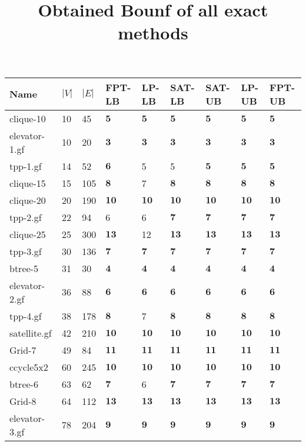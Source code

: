 \documentclass{article}
\title{Obtained Bounf of all exact methods}
\begin{document}
\maketitle

\begin{longtable}{|l |l |l |l |l |l |l |l |l |}
\hline
Name&$|V|$&$|E|$&FPT-LB&LP-LB&SAT-LB&SAT-UB&LP-UB&FPT-UB\\
\hline
clique-10&10&45&$\mathbf{5}$&$\mathbf{5}$&$\mathbf{5}$&$\mathbf{5}$&$\mathbf{5}$&$\mathbf{5}$\\
elevator-1.gf&10&20&$\mathbf{3}$&$\mathbf{3}$&$\mathbf{3}$&$\mathbf{3}$&$\mathbf{3}$&$\mathbf{3}$\\
tpp-1.gf&14&52&$\mathbf{6}$&5&5&$\mathbf{5}$&$\mathbf{5}$&$\mathbf{5}$\\
clique-15&15&105&$\mathbf{8}$&7&$\mathbf{8}$&$\mathbf{8}$&$\mathbf{8}$&$\mathbf{8}$\\
clique-20&20&190&$\mathbf{10}$&$\mathbf{10}$&$\mathbf{10}$&$\mathbf{10}$&$\mathbf{10}$&$\mathbf{10}$\\
tpp-2.gf&22&94&6&6&$\mathbf{7}$&$\mathbf{7}$&$\mathbf{7}$&$\mathbf{7}$\\
clique-25&25&300&$\mathbf{13}$&12&$\mathbf{13}$&$\mathbf{13}$&$\mathbf{13}$&$\mathbf{13}$\\
tpp-3.gf&30&136&$\mathbf{7}$&$\mathbf{7}$&$\mathbf{7}$&$\mathbf{7}$&$\mathbf{7}$&$\mathbf{7}$\\
btree-5&31&30&$\mathbf{4}$&$\mathbf{4}$&$\mathbf{4}$&$\mathbf{4}$&$\mathbf{4}$&$\mathbf{4}$\\
elevator-2.gf&36&88&$\mathbf{6}$&$\mathbf{6}$&$\mathbf{6}$&$\mathbf{6}$&$\mathbf{6}$&$\mathbf{6}$\\
tpp-4.gf&38&178&$\mathbf{8}$&7&$\mathbf{8}$&$\mathbf{8}$&$\mathbf{8}$&$\mathbf{8}$\\
satellite.gf&42&210&$\mathbf{10}$&$\mathbf{10}$&$\mathbf{10}$&$\mathbf{10}$&$\mathbf{10}$&$\mathbf{10}$\\
Grid-7&49&84&$\mathbf{11}$&$\mathbf{11}$&$\mathbf{11}$&$\mathbf{11}$&$\mathbf{11}$&$\mathbf{11}$\\
ccycle5x2&60&245&$\mathbf{10}$&$\mathbf{10}$&$\mathbf{10}$&$\mathbf{10}$&$\mathbf{10}$&$\mathbf{10}$\\
btree-6&63&62&$\mathbf{7}$&6&$\mathbf{7}$&$\mathbf{7}$&$\mathbf{7}$&$\mathbf{7}$\\
Grid-8&64&112&$\mathbf{13}$&$\mathbf{13}$&$\mathbf{13}$&$\mathbf{13}$&$\mathbf{13}$&$\mathbf{13}$\\
elevator-3.gf&78&204&$\mathbf{9}$&$\mathbf{9}$&$\mathbf{9}$&$\mathbf{9}$&$\mathbf{9}$&$\mathbf{9}$\\

\end{longtable}
\end{document}
